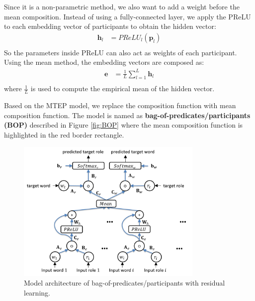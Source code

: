 \documentclass[a4paper]{article}
\begin{document}
Since it is a non-parametric method, we also want to add a weight before the mean composition. Instead of using a fully-connected layer, we apply the PReLU to each embedding vector of participants to obtain the hidden vector: 
\begin{equation} \label{eq:nonlinearity-bop}
\begin{aligned}
    \mathbf{h}_l
        &= PReLU_l(\mathbf{p}_l) \\
\end{aligned}
\end{equation}
So the parameters inside PReLU can also act as weights of each participant. Using the mean method, the embedding vectors are composed as:
\begin{equation} \label{eq:mean-comp-bop}
\begin{aligned}
    \mathbf{e}
        &= \frac{1}{L} \sum_{l=1}^{L} \mathbf{h}_{l} \\
\end{aligned}
\end{equation}
where $\frac{1}{L}$ is used to compute the empirical mean of the hidden vector. 

Based on the MTEP model, we replace the composition function with mean composition function. The model is named as \textbf{bag-of-predicates/participants (BOP)} described in Figure \ref{fig:BOP} where the mean composition function is highlighted in the red border rectangle. 


\begin{figure}[t]
\centering
\includegraphics[width=0.8\textwidth]{BOPRes.png}
\caption{\label{fig:BOPRes} Model architecture of bag-of-predicates/participants with residual learning.}
\end{figure}
% 
% 
% 
% 
% 
%
\end{document}
